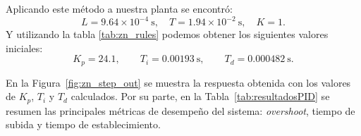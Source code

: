 Aplicando este método a nuestra planta se encontró:
\[
L = 9.64 \times 10^{-4}~\text{s}, \quad T = 1.94\times 10^{-2}~\text{s}, \quad K=1.
\]
Y utilizando la tabla \ref{tab:zn_rules} podemos obtener los siguientes valores iniciales:
\[
K_p = 24.1, \qquad T_i = 0.00193~\text{s}, \qquad T_d = 0.000482~\text{s}.
\]

En la Figura~\ref{fig:zn_step_out} se muestra la respuesta obtenida con los valores de $K_p$, $T_i$ y $T_d$ calculados. 
Por su parte, en la Tabla~\ref{tab:resultadosPID} se resumen las principales métricas de desempeño del sistema: \emph{overshoot}, tiempo de subida y tiempo de establecimiento.

